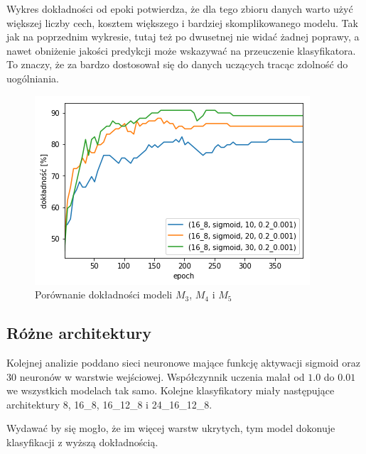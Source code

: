     Wykres dokładności od epoki potwierdza, że dla tego zbioru danych warto użyć większej liczby cech, kosztem większego i bardziej skomplikowanego modelu.
    Tak jak na poprzednim wykresie, tutaj też po dwusetnej nie widać żadnej poprawy, a nawet obniżenie jakości predykcji może wskazywać na przeuczenie klasyfikatora.
    To znaczy, że za bardzo dostosował się do danych uczących tracąc zdolność do uogólniania.

    \begin{figure}[htp]
        \centering
        \includegraphics[scale=0.8]{./img/feat-accuracy.png}
        \caption{Porównanie dokładności modeli $M_3$, $M_4$ i $M_5$}
    \end{figure}

    \subsection{Różne architektury}\label{subsec:różneArchitektury}

    Kolejnej analizie poddano sieci neuronowe mające funkcję aktywacji sigmoid oraz 30 neuronów w warstwie wejściowej.
    Współczynnik uczenia malał od $1.0$ do $0.01$ we wszystkich modelach tak samo.
    Kolejne klasyfikatory miały następujące architektury 8, 16\_8, 16\_12\_8 i 24\_16\_12\_8.

    Wydawać by się mogło, że im więcej warstw ukrytych, tym model dokonuje klasyfikacji z wyższą dokładnością.

